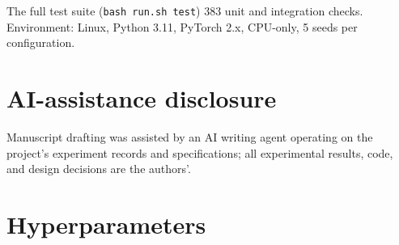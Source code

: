 \documentclass[10pt,twoside]{article}
\theoremstyle{definition}
\begin{document}
The full test suite (\texttt{bash run.sh test}) 383 unit and integration checks. Environment: Linux, Python 3.11, PyTorch 2.x, CPU-only, 5 seeds per configuration.

\section*{AI-assistance disclosure}

Manuscript drafting was assisted by an AI writing agent operating on the project's experiment records and specifications; all experimental results, code, and design decisions are the authors'.




\appendix

\clearpage

\section{Hyperparameters}
\label{app:hyper}
\end{document}
